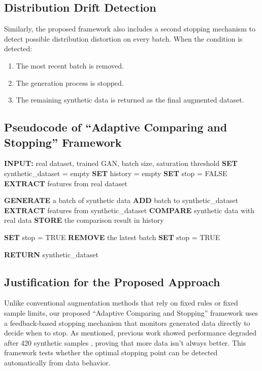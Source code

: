 \documentclass[12pt,a4paper]{report}
\begin{document}
\begin{justify}
\subsection{Distribution Drift Detection}
Similarly, the proposed framework also includes a second stopping mechanism to detect possible distribution distortion on every batch. When the condition is detected:
\begin{enumerate}
    \item The most recent batch is removed.
    \item The generation process is stopped.
    \item The remaining synthetic data is returned as the final augmented dataset.
\end{enumerate}

\newpage
\subsection{Pseudocode of “Adaptive Comparing and Stopping” Framework}
\begin{algorithm}
\caption{Synthetic Data Generation with Saturation and Distribution Drift Detection}
\begin{algorithmic}[1]

\State \textbf{INPUT:} real dataset, trained GAN, batch size, saturation threshold
\State \textbf{SET} synthetic\_dataset = empty
\State \textbf{SET} history = empty
\State \textbf{SET} stop = FALSE
\State \textbf{EXTRACT} features from real dataset

    \State \textbf{GENERATE} a batch of synthetic data
    \State \textbf{ADD} batch to synthetic\_dataset
    \State \textbf{EXTRACT} features from synthetic\_dataset
    \State \textbf{COMPARE} synthetic data with real data
    \State \textbf{STORE} the comparison result in history
    
        \State \textbf{SET} stop = TRUE
        \State \textbf{REMOVE} the latest batch
        \State \textbf{SET} stop = TRUE
    \EndIf

\EndWhile

\State \textbf{RETURN} synthetic\_dataset

\end{algorithmic}
\end{algorithm}

\subsection{Justification for the Proposed Approach}
Unlike conventional augmentation methods that rely on fixed rules or fixed sample limits, our proposed ``Adaptive Comparing and Stopping'' framework uses a feedback-based stopping mechanism that monitors generated data directly to decide when to stop. As mentioned, previous work showed performance degraded after 420 synthetic samples \parencite{zhu2025novel}, proving that more data isn't always better. This framework tests whether the optimal stopping point can be detected automatically from data behavior.


\end{justify}
\end{document}
